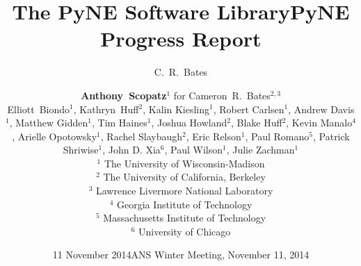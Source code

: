 \documentclass[xcolor=x11names,compress]{beamer}
\title{The PyNE Software Library}
\author{C.\ R.\ Bates}
\date{11 November 2014}
\begin{document}
\begin{frame}
\title{PyNE Progress Report}
\author{\textbf{Anthony~Scopatz$^{1}$} for Cameron~R.~Bates$^{2,3}$ \\
        \vspace{0.1in}
        Elliott~Biondo$^{1}$, Kathryn~Huff$^{2}$,
        Kalin Kiesling$^{1}$,
        Robert Carlsen$^{1}$,
        Andrew Davis$^{1}$,
        Matthew Gidden$^{1}$,
        Tim Haines$^{1}$,
        Joshua Howland$^{2}$,
        Blake Huff$^{2}$,
        Kevin Manalo$^{4}$,
        Arielle Opotowsky$^{1}$,
        Rachel Slaybaugh$^{2}$,
        Eric Relson$^{1}$,
        Paul Romano$^{5}$,
        Patrick Shriwise$^{1}$,
        John D. Xia$^{6}$,
        Paul Wilson$^{1}$,
        Julie Zachman$^{1}$\\
        \vspace{0.1in}
        $^{1}$ The University of Wisconsin-Madison\\
        $^{2}$ The University of California, Berkeley\\
        $^{3}$ Lawrence Livermore National Laboratory\\
        $^{4}$ Georgia Institute of Technology\\
        $^{5}$ Massachusetts Institute of Technology\\
        $^{6}$ University of Chicago}

\date{ANS Winter Meeting, November 11, 2014}
\titlepage
\end{frame}
\end{document}
